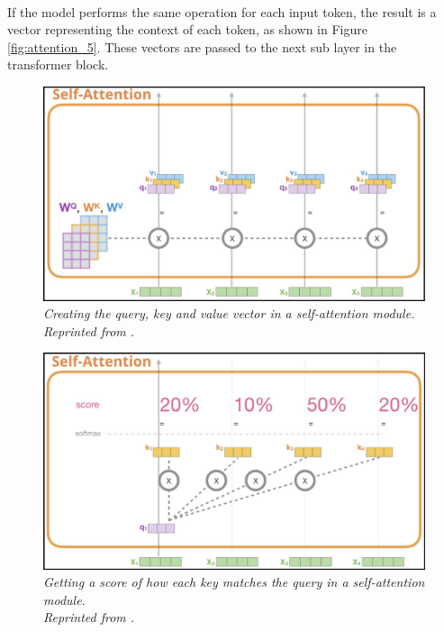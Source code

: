 \paragraph{}
If the model performs the same operation for each input token, the result is a vector representing the context of each token, as shown in Figure \ref{fig:attention_5}. These vectors are passed to the next sub layer in the transformer block.

\begin{figure}[H]
  \centering
  \caption[Creating the query, key and value vector in a self-attention module.]{\emph{Creating the query, key and value vector in a self-attention module. \\ 
  Reprinted from \citeauthor{alammar_2018} \citeyear{alammar_2018}.}}\label{fig:attention_2}
  \includegraphics[scale = 0.3]{figures/attention_2.jpg}  
\end{figure}

\begin{figure}[H]
  \centering
  \caption[Getting a score of how each key matches the query in a self-attention module.]{\emph{Getting a score of how each key matches the query in a self-attention module. \\ 
  Reprinted from \citeauthor{alammar_2018} \citeyear{alammar_2018}.}}\label{fig:attention_3}
  \includegraphics[scale = 0.3]{figures/attention_3.jpg}  
\end{figure}

